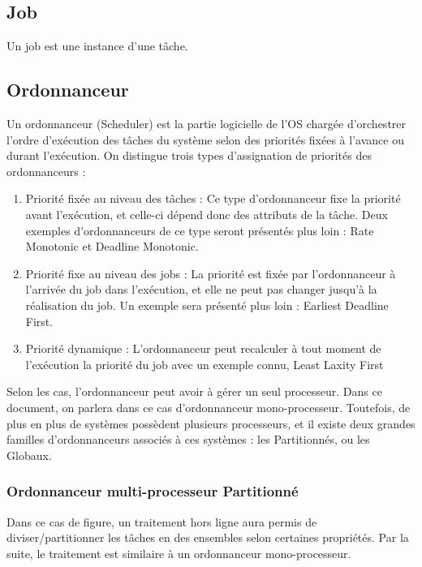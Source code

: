 \documentclass[11pt,a4paper,oneside]{report}
\begin{document}
\subsection{Job}
Un job est une instance d'une tâche. %

\subsection{Ordonnanceur}
Un ordonnanceur (Scheduler) est la partie logicielle de 
l'OS chargée d'orchestrer l'ordre d'exécution des tâches du système 
selon des priorités fixées à l'avance ou durant l'exécution. 
On distingue trois types d'assignation de priorités des ordonnanceurs : \\
\begin{enumerate}
	\item Priorité fixée au niveau des tâches : Ce type d'ordonnanceur fixe la priorité 
	avant l'exécution, et celle-ci dépend donc des attributs de la tâche. 
	Deux exemples d'ordonnanceurs de ce type seront présentés plus loin : Rate Monotonic et 
	Deadline Monotonic.
	\item Priorité fixe au niveau des jobs : La priorité est fixée par l'ordonnanceur à l'arrivée du job 
	dans l'exécution, et elle ne peut pas changer jusqu'à la réalisation du job. Un exemple sera présenté plus loin : Earliest Deadline First.
	\item Priorité dynamique : L'ordonnanceur peut recalculer à tout moment de l'exécution 
	la priorité du job avec un exemple connu, Least Laxity First %
\end{enumerate}
	
Selon les cas, l'ordonnanceur peut avoir à gérer un seul processeur. Dans ce 
document, on parlera dans ce cas d'ordonnanceur mono-processeur. Toutefois, de plus en 
plus de systèmes possèdent plusieurs processeurs, et il existe deux grandes familles 
d'ordonnanceurs associés à ces systèmes : les Partitionnés, ou les Globaux. \\


\subsubsection{Ordonnanceur multi-processeur Partitionné}
Dans ce cas de figure, un traitement hors ligne aura permis de diviser/partitionner 
les tâches en des ensembles selon certaines propriétés. Par la suite, le traitement 
est similaire à un ordonnanceur mono-processeur.
\end{document}
